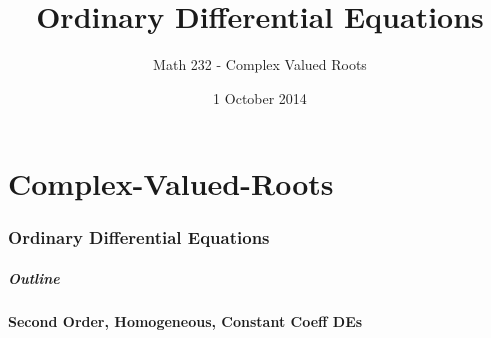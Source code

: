 \part{Complex-Valued-Roots}
\section{Ordinary Differential Equations}

\title{Ordinary Differential Equations}
\subtitle{Math 232 - Complex Valued Roots}
\date{1 October 2014}

\begin{frame}
  \titlepage
\end{frame}

\begin{frame}
  \frametitle{Outline}
  \tableofcontents[currentsection]
\end{frame}


\subsection{Second Order, Homogeneous, Constant Coeff DEs}

